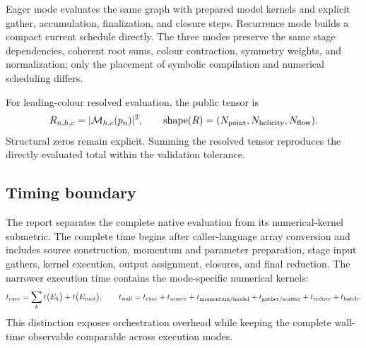Eager mode evaluates the same graph with prepared model kernels and explicit
gather, accumulation, finalization, and closure steps.  Recurrence mode builds
a compact current schedule directly.  The three modes preserve the same stage
dependencies, coherent root sums, colour contraction, symmetry weights, and
normalization; only the placement of symbolic compilation and numerical
scheduling differs.

For leading-colour resolved evaluation, the public tensor is
\begin{equation}
  R_{n,h,c}=|{\cal M}_{h,c}(p_n)|^2,
  \qquad
  \operatorname{shape}(R)=
  (N_{\rm point},N_{\rm helicity},N_{\rm flow}) .
  \label{eq:zgg-resolved-shape}
\end{equation}
Structural zeros remain explicit.  Summing the resolved tensor reproduces the
directly evaluated total within the validation tolerance.

\subsection{Timing boundary}

The report separates the complete native evaluation from its numerical-kernel
submetric.  The complete time begins after caller-language array conversion and
includes source construction, momentum and parameter preparation, stage input
gathers, kernel execution, output assignment, closures, and final reduction.
The narrower execution time contains the mode-specific numerical kernels:
\begin{equation}
 t_{\rm exec}=\sum_{k}t\bigl(E_k\bigr)+t\bigl(E_{\rm root}\bigr),
 \qquad
 t_{\rm wall}=t_{\rm exec}+t_{\rm source}+t_{\rm momentum/model}
 +t_{\rm gather/scatter}+t_{\rm reduce}+t_{\rm batch}.
 \label{eq:zgg-timing-boundary}
\end{equation}
This distinction exposes orchestration overhead while keeping the complete
wall-time observable comparable across execution modes.
